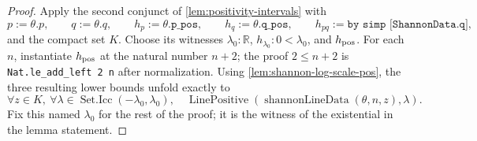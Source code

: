 \documentclass[9pt]{extarticle}
\theoremstyle{definition}
\theoremstyle{remark}
\newcommand{\R}{\mathbb R}
\begin{document}
\begin{proof}
Apply the second conjunct of \cref{lem:positivity-intervals} with
\[
 p:=\theta.p,\qquad q:=\theta.q,\qquad
 h_p:=\theta.\texttt{p\_pos},\qquad
 h_q:=\theta.\texttt{q\_pos},\qquad
 h_{pq}:=\texttt{by simp [ShannonData.q]},
\]
and the compact set $K$.  Choose its witnesses
$\lambda_0:\R$, $h_{\lambda_0}:0<\lambda_0$, and $h_{\rm pos}$.
For each $n$, instantiate $h_{\rm pos}$ at the natural number $n+2$;
the proof $2\leq n+2$ is \texttt{Nat.le\_add\_left 2 n} after
normalization.  Using \cref{lem:shannon-log-scale-pos}, the three resulting
lower bounds unfold exactly to
\[
 \forall z\in K,\ \forall\lambda\in
  \operatorname{Set.Icc}(-\lambda_0,\lambda_0),\quad
 \operatorname{LinePositive}
  (\operatorname{shannonLineData}(\theta,n,z),\lambda).
\]
Fix this named $\lambda_0$ for the rest of the proof; it is the witness of
the existential in the lemma statement.


\end{proof}
\end{document}
